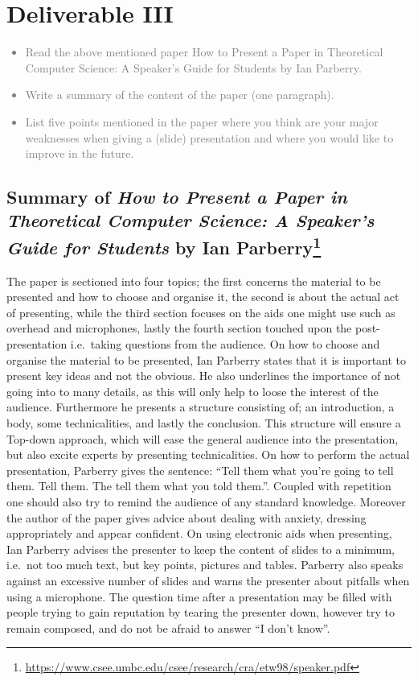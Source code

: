 \chapter{Deliverable III}
\textcolor{gray}{%
\begin{itemize}
    \item Read the above mentioned paper How to Present a Paper in Theoretical Computer Science: A Speaker’s Guide for Students by Ian Parberry.
    \item Write a summary of the content of the paper (one paragraph).
    \item List five points mentioned in the paper where you think are your major weaknesses when giving a (slide) presentation and where you would like to improve in the future.
\end{itemize}}
\section{Summary of \textit{How to Present a Paper in Theoretical Computer Science: A Speaker’s Guide for Students} by Ian Parberry\footnote{\url{https://www.csee.umbc.edu/csee/research/cra/etw98/speaker.pdf}}}
The paper is sectioned into four topics; the first concerns the material to be presented and how to choose and organise it, the second is about the actual act of presenting, while the third section focuses on the aids one might use such as overhead and microphones, lastly the fourth section touched upon the post-presentation i.e.\ taking questions from the audience.
On how to choose and organise the material to be presented, Ian Parberry states that it is important to present key ideas and not the obvious.
He also underlines the importance of not going into to many details, as this will only help to loose the interest of the audience.
Furthermore he presents a structure consisting of; an introduction, a body, some technicalities, and lastly the conclusion.
This structure will ensure a Top-down approach, which will ease the general audience into the presentation, but also excite experts by presenting technicalities.
On how to perform the actual presentation, Parberry gives the sentence: \enquote{Tell them what you're going to tell them. Tell them. The tell them what you told them.}.
Coupled with repetition one should also try to remind the audience of any standard knowledge.
Moreover the author of the paper gives advice about dealing with anxiety, dressing appropriately and appear confident.
On using electronic aids when presenting, Ian Parberry advises the presenter to keep the content of slides to a minimum, i.e.\ not too much text, but key points, pictures and tables.
Parberry also speaks against an excessive number of slides and warns the presenter about pitfalls when using a microphone.
The question time after a presentation may be filled with people trying to gain reputation by tearing the presenter down, however try to remain composed, and do not be afraid to answer \enquote{I don't know}.
